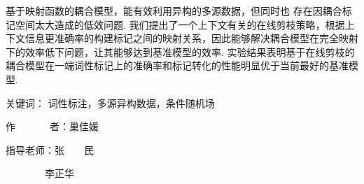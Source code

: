 \begin{cabstract}
\begin{enumerate}
              基于映射函数的耦合模型，能有效利用异构的多源数据，但同时也 存在因耦合标记空间太大造成的低效问题.
              我们提出了一个上下文有关的在线剪枝策略，根据上下文信息更准确率的构建标记之间的映射关系，因此能够解决耦合模型在完全映射下的效率低下问题，让其能够达到基准模型的效率.
              实验结果表明基于在线剪枝的耦合模型在一端词性标记上的准确率和标记转化的性能明显优于当前最好的基准模型.
    \end{enumerate}

    \vskip 21bp
        {\heiti{} 关键词：} 词性标注，多源异构数据，条件随机场

    \begin{flushright}
        作~~~~~~~者：巢佳媛

        指导老师：张~~~~民

        ~~~~~~~~李正华
    \end{flushright}


\end{cabstract}

